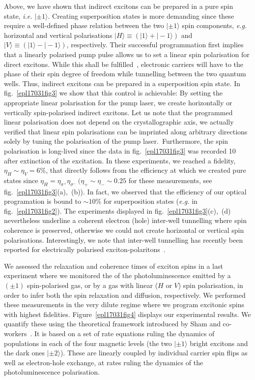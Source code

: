 \documentclass[doublecol,final]{epl2}
\begin{document}
Above, we have shown that indirect excitons can be prepared in a pure spin state, \textit{i.e.} $|\pm1\rangle$. Creating superposition states is more demanding since these require a well-defined phase relation between the two $|\pm1\rangle$ spin components, \textit{e.g.} horizontal and vertical polarisations $|H\rangle\equiv (|1\rangle+ |-1\rangle)$ and $|V\rangle\equiv(|1\rangle-|-1\rangle)$, respectively. Their successful programmation first implies that a linearly polarised pump pulse allows us to set a linear spin polarisation for direct excitons. While this  shall be fulfilled~\cite{epl17031bib7}, electronic carriers will have to  the phase of their spin degree of freedom while tunnelling between the two quantum wells. Thus, indirect excitons can be prepared in a superposition spin state. In fig.~\ref{epl17031fig3} we show that this control is achievable: By setting the appropriate linear polarisation for the pump laser, we create horizontally or vertically spin-polarised indirect excitons. Let us note that the programmed linear polarisation does not depend on the crystallographic axis, we actually verified that linear spin polarisations can be imprinted along arbitrary directions solely by tuning the polarisation of the pump laser.~Furthermore, the spin polarisation is long-lived since the data in fig.~\ref{epl17031fig3} was recorded 10 after extinction of the excitation. In these experiments, we reached a fidelity, $\eta_H\sim\eta_V= 6{\%}$, that directly follows from the efficiency at which we created pure states since $\eta_H=\eta_\mathrm{\sigma^+}\eta_{\sigma^-}\ (\eta_+\sim \eta_- \sim 0.25$ for these measurements, see fig.~\ref{epl17031fig3}(a),~(b)). In fact, we observed that the efficiency of our optical programation is bound to $\sim 10{\%}$ for superposition states (\textit{e.g.} in fig.~\ref{epl17031fig2}). The experiments displayed in fig.~\ref{epl17031fig3}(c),~(d) nevertheless underline a coherent electron (hole) inter-well tunnelling where spin coherence is preserved, otherwise we could not create horizontal or vertical spin polarisations. Interestingly, we note that  inter-well tunnelling has recently been reported for electrically polarised exciton-polaritons~\cite{epl17031bib24}.

We assessed the relaxation and coherence times of exciton spins in a last experiment where we monitored the  of the photoluminescence emitted by a $(\pm 1)$ spin-polarised gas, or by a gas with linear ($H$ or $V$) spin polarisation, in order to infer both the spin relaxation and diffusion, respectively. We performed these measurements in the very dilute regime where we program excitonic spins with highest fidelities. Figure~\ref{epl17031fig4} displays our experimental results. We quantify these using the theoretical framework introduced by Sham and co-workers~\cite{epl17031bib1}. It is based on a set of rate equations ruling the dynamics of populations in each of the four magnetic levels (the two $|\pm1\rangle$ bright excitons and the dark ones $|\pm2\rangle$). These are linearly coupled by individual carrier spin flips as well as electron-hole exchange, at rates ruling the dynamics of the photoluminescence polarisation.
\end{document}
